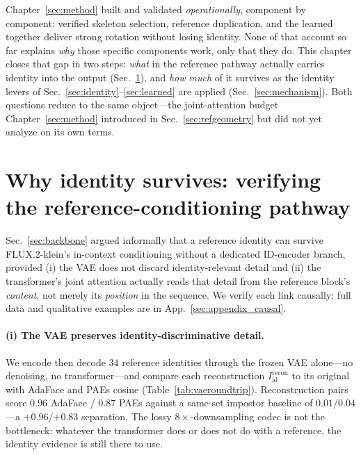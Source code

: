 \label{sec:whyworks}
Chapter~\ref{sec:method} built and validated \method{} \emph{operationally},
component by component: verified skeleton selection, reference duplication,
and the learned \gate{} together deliver strong rotation without losing
identity. None of that account so far explains \emph{why} those specific
components work, only that they do. This chapter closes that gap in two
steps: \emph{what} in the reference pathway actually carries identity into
the output (Sec.~\ref{sec:refverify}), and \emph{how much} of it survives as
the identity levers of Sec.~\ref{sec:identity}--\ref{sec:learned} are applied
(Sec.~\ref{sec:mechanism}). Both questions reduce to the same object---the
joint-attention budget Chapter~\ref{sec:method} introduced in
Sec.~\ref{sec:refgeometry} but did not yet analyze on its own terms.

\section{Why identity survives: verifying the reference-conditioning pathway}
\label{sec:refverify}
Sec.~\ref{sec:backbone} argued informally that a reference identity can survive
FLUX.2-klein's in-context conditioning without a dedicated ID-encoder branch,
provided (i) the VAE does not discard identity-relevant detail and (ii) the
transformer's joint attention actually reads that detail from the reference
block's \emph{content}, not merely its \emph{position} in the sequence. We
verify each link causally; full data and qualitative examples are in
App.~\ref{sec:appendix_causal}.

\paragraph{(i) The VAE preserves identity-discriminative detail.} We encode
then decode $34$ reference identities through the frozen VAE alone---no
denoising, no transformer---and compare each reconstruction
$I_{\mathrm{id}}^{\mathrm{recon}}$ to its original with AdaFace and PAEs
cosine (Table~\ref{tab:vaeroundtrip}). Reconstruction pairs score
$0.96$ AdaFace / $0.87$ PAEs against a same-set impostor baseline of
$0.01$/$0.04$---a $+0.96$/$+0.83$ separation. The lossy $8\times$-downsampling
codec is not the bottleneck: whatever the transformer does or does not do with
a reference, the identity evidence is still there to use.

